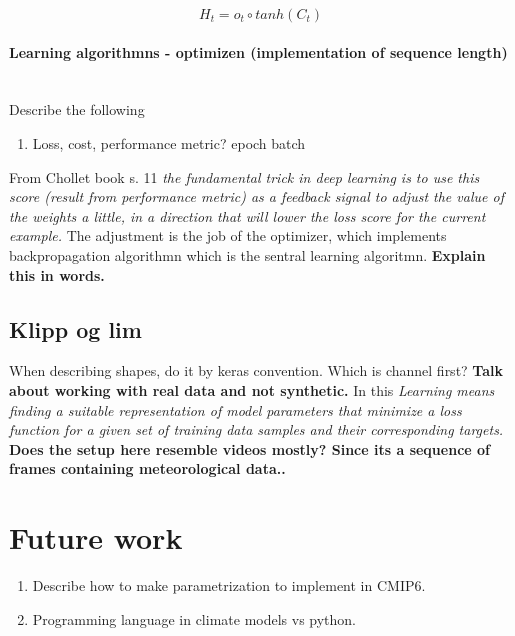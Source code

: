 \begin{equation} \label{eq:CLSTM5_hidden_state}
        H_t = o_t \circ tanh \left( C_t \right)
\end{equation}

\paragraph{Learning algorithmns - optimizen (implementation of sequence length)} \mbox{}\\
Describe the following
\begin{enumerate}
    \item Loss, cost, performance metric? epoch batch
\end{enumerate}

From Chollet book s. 11 \textit{the fundamental trick in deep learning is to use this score (result from performance metric) as a feedback signal to adjust the value of the weights a little, in a direction that will lower the loss score for the current example. } The adjustment is the job of the optimizer, which implements backpropagation algorithmn which is the sentral learning algoritmn.
\textbf{Explain this in words.}



\subsection{Klipp og lim}


When describing shapes, do it by keras convention. Which is channel first? \textbf{Talk about working with real data and not synthetic.} In this 
\textit{Learning means finding a suitable representation of model parameters that minimize a loss function for a given set of training data samples and their corresponding targets.}
\textbf{Does the setup here resemble videos mostly? Since its a sequence of frames containing meteorological data..}

\section{Future work}
\begin{enumerate}
    \item Describe how to make parametrization to implement in CMIP6.
    \item Programming language in climate models vs python.
\end{enumerate}






